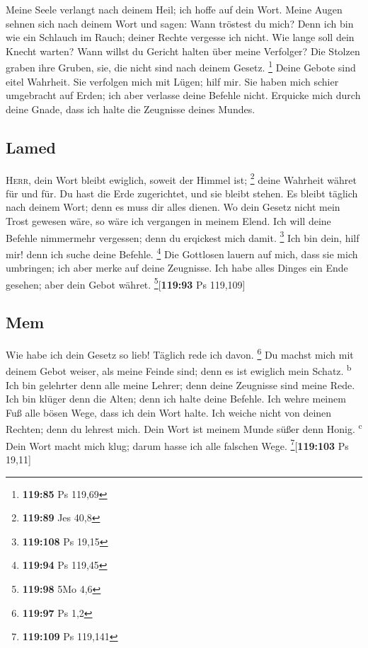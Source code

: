  Meine Seele verlangt nach deinem Heil; ich hoffe auf
dein Wort.  Meine Augen sehnen sich nach deinem Wort und
sagen: Wann tröstest du mich?  Denn ich bin wie ein
Schlauch im Rauch; deiner Rechte vergesse ich nicht.  Wie
lange soll dein Knecht warten? Wann willst du Gericht halten über meine
Verfolger?  Die Stolzen graben ihre Gruben, sie, die
nicht sind nach deinem Gesetz. \footnote{\textbf{119:85} Ps 119,69}
 Deine Gebote sind eitel Wahrheit. Sie verfolgen mich mit
Lügen; hilf mir.  Sie haben mich schier umgebracht auf
Erden; ich aber verlasse deine Befehle nicht.  Erquicke
mich durch deine Gnade, dass ich halte die Zeugnisse deines Mundes.

\hypertarget{lamed}{%
\subsection{Lamed}\label{lamed}}

 \textsc{Herr}, dein Wort bleibt ewiglich, soweit der
Himmel ist; \footnote{\textbf{119:89} Jes 40,8}  deine
Wahrheit währet für und für. Du hast die Erde zugerichtet, und sie
bleibt stehen.  Es bleibt täglich nach deinem Wort; denn
es muss dir alles dienen.  Wo dein Gesetz nicht mein
Trost gewesen wäre, so wäre ich vergangen in meinem Elend.
 Ich will deine Befehle nimmermehr vergessen; denn du
erqickest mich damit. \footnote{\textbf{119:108} Ps 19,15}
 Ich bin dein, hilf mir! denn ich suche deine Befehle.
\footnote{\textbf{119:94} Ps 119,45}  Die Gottlosen
lauern auf mich, dass sie mich umbringen; ich aber merke auf deine
Zeugnisse.  Ich habe alles Dinges ein Ende gesehen; aber
dein Gebot währet. \footnote{\textbf{119:98} 5Mo 4,6}{[}\textbf{119:93}
Ps 119,109{]}

\hypertarget{mem}{%
\subsection{Mem}\label{mem}}

 Wie habe ich dein Gesetz so lieb! Täglich rede ich
davon. \footnote{\textbf{119:97} Ps 1,2}  Du machst mich
mit deinem Gebot weiser, als meine Feinde sind; denn es ist ewiglich
mein Schatz. \textsuperscript{b}  Ich bin gelehrter denn
alle meine Lehrer; denn deine Zeugnisse sind meine Rede.
 Ich bin klüger denn die Alten; denn ich halte deine
Befehle.  Ich wehre meinem Fuß alle bösen Wege, dass ich
dein Wort halte.  Ich weiche nicht von deinen Rechten;
denn du lehrest mich.  Dein Wort ist meinem Munde süßer
denn Honig. \textsuperscript{c}  Dein Wort macht mich
klug; darum hasse ich alle falschen Wege. \footnote{\textbf{119:109} Ps
  119,141}{[}\textbf{119:103} Ps 19,11{]}

